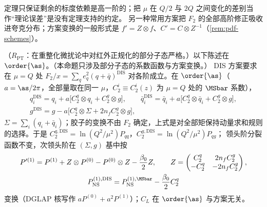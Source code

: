 \noindent
定理只保证剩余的标度依赖是高一阶的；把 $\mu$ 在 $Q/2$ 与 $2Q$ 之间变化的差别当作“理论误差”是没有定理支持的约定。
另一种常用方案把 $F_2$ 的全部高阶修正吸收进夸克分布；方案变换的一般形式是 $f'=Z\otimes f$、$C'=C\otimes Z^{-1}$（\cref{rem:pdf-schemes}）。

\begin{proposition}\label{prop:disall-dis-scheme}
（$R_{\mathrm{PT}}$：在重整化微扰论中对红外正规化的部分子态严格。）以下陈述在 $\order{\as}$。（本命题只涉及部分子态的系数函数与方案变换。）
DIS 方案要求在 $\mu=Q$ 处 $F_2/x=\sum_qe_q^2(q+\bar q)^{\mathrm{DIS}}$ 对各阶成立。在 $\order{\as}$（$a=\as/2\pi$，全部量取在同一 $\mu$，$C_2^i\equiv C_2^i(z)$ 为 $\mu=Q$ 处的 $\MSbar$ 系数），
\begin{equation}\label{eq:disall-dis-scheme}
\begin{gathered}
q_i^{\mathrm{DIS}}=q_i+a\big[C_2^q\otimes q_i+C_2^g\otimes g\big],\qquad \bar q_i^{\mathrm{DIS}}=\bar q_i+a\big[C_2^q\otimes\bar q_i+C_2^g\otimes g\big],\\
g^{\mathrm{DIS}}=g-a\big[C_2^q\otimes\Sigma+2n_fC_2^g\otimes g\big],   %
\end{gathered}
\end{equation}
$\Sigma=\sum_i(q_i+\bar q_i)$；胶子的变换不由 $F_2$ 确定，上式是对全部矩保持动量求和规则的选择。于是 $C_2^{q,\mathrm{DIS}}=\ln(Q^2/\mu^2)P_{qq}$，$C_2^{g,\mathrm{DIS}}=\ln(Q^2/\mu^2)P_{qg}$；
领头阶分裂函数不变，次领头阶在 $(\Sigma,g)$ 基中按
\begin{equation}\label{eq:disall-P1}
\begin{gathered}
P'^{(1)}=P^{(1)}+Z\otimes P^{(0)}-P^{(0)}\otimes Z-\frac{\beta_0}2Z,\qquad Z=\begin{pmatrix}C_2^q&2n_fC_2^g\\-C_2^q&-2n_fC_2^g\end{pmatrix},\\
P^{(1),\mathrm{DIS}}_{\mathrm{NS}}=P^{(1),\MSbar}_{\mathrm{NS}}-\frac{\beta_0}2C_2^q   %
\end{gathered}
\end{equation}
变换（DGLAP 核写作 $aP^{(0)}+a^2P^{(1)}$）；$C_L$ 在 $\order{\as}$ 与方案无关。
\end{proposition}

